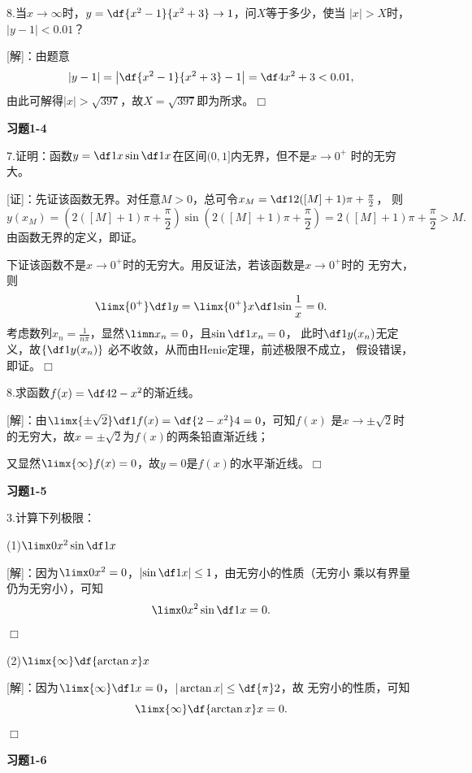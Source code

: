 \bigskip

8.当$x\to\infty$时，$y=\df{x^2-1}{x^2+3}\to1$，问$X$等于多少，使当
$|x|>X$时，$|y-1|<0.01$？

[解]：由题意
$$|y-1|=\left|\df{x^2-1}{x^2+3}-1\right|=\df4{x^2+3}<0.01,$$
由此可解得$|x|>\sqrt{397}$，故$X=\sqrt{397}$即为所求。\hfill$\Box$

\bigskip

\begin{center}
	\bf 习题1-4
\end{center}

7.证明：函数$y=\df1x\sin\df1x$在区间$(0,1]$内无界，但不是$x\to0^+$
时的无穷大。

[证]：先证该函数无界。对任意$M>0$，总可令$x_M=\df1{2([M]+1)\pi+\frac{\pi}2}$，
则
$$y(x_M)=\left(2([M]+1)\pi+\frac{\pi}2\right)\sin(2([M]+1)\pi+\frac{\pi}2)
=2([M]+1)\pi+\frac{\pi}2>M.$$
由函数无界的定义，即证。

下证该函数不是$x\to0^+$时的无穷大。用反证法，若该函数是$x\to0^+$时的
无穷大，则
$$\limx{0^+}\df1y=\limx{0^+}x\df1{\sin\frac1x}=0.$$
考虑数列$x_n=\frac1{n\pi}$，显然$\limn x_n=0$，且$\sin\df1{x_n}=0$，
此时$\df1{y(x_n)}$无定义，故$\left\{\df1{y(x_n)}\right\}$
必不收敛，从而由Henie定理，前述极限不成立，
假设错误，即证。\hfill$\Box$

\bigskip

8.求函数$f(x)=\df4{2-x^2}$的渐近线。

[解]：由$\limx{\pm\sqrt 2}\df1{f(x)}=\df{2-x^2}4=0$，可知$f(x)$
是$x\to\pm\sqrt2$时的无穷大，故$x=\pm\sqrt2$为$f(x)$的两条铅直渐近线；

又显然$\limx{\infty}f(x)=0$，故$y=0$是$f(x)$的水平渐近线。\hfill$\Box$

\bigskip

\begin{center}
	\bf 习题1-5
\end{center}

3.计算下列极限：

(1)$\limx0x^2\sin\df1x$

[解]：因为$\limx0x^2=0$，$\left|\sin\df1x\right|\leq1$，由无穷小的性质（无穷小
乘以有界量仍为无穷小），可知
$$\limx0x^2\sin\df1x=0.$$
\hfill$\Box$

\bigskip

(2)$\limx{\infty}\df{\arctan x}x$

[解]：因为$\limx{\infty}\df1x=0$，$|\arctan x|\leq\df{\pi}2$，故
无穷小的性质，可知
$$\limx{\infty}\df{\arctan x}x=0.$$
\hfill$\Box$

\begin{center}
	\bf 习题1-6
\end{center}

